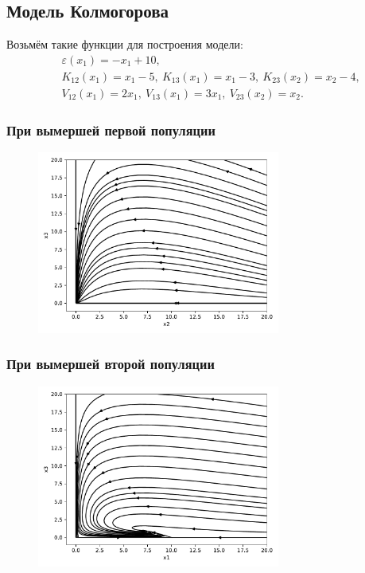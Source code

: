     \pagebreak
    \subsection{Модель Колмогорова}
    Возьмём такие функции для построения модели:
    \[
        \begin{split}
            & \varepsilon (x_1) = -x_1 + 10, \\
            & K_{12} (x_1) = x_1 - 5, ~ K_{13} (x_1) = x_1 - 3, ~ K_{23} (x_2) = x_2 - 4, \\
            & V_{12} (x_1) = 2 x_1, ~ V_{13} (x_1) = 3 x_1, ~ V_{23} (x_2) = x_2.
        \end{split}
    \]

    \subsubsection{При вымершей первой популяции}

    \begin{figure}[H]
        \centering
        \includegraphics[width=8cm]{pictures/kx1_0vector.pdf}
    \end{figure}


    \subsubsection{При вымершей второй популяции}

    \begin{figure}[H]
        \centering
        \includegraphics[width=8cm]{pictures/kx2_0vector.pdf}
    \end{figure}


